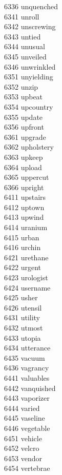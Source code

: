 6336 unquenched \\
6341 unroll \\
6342 unscrewing \\
6343 untied \\
6344 unusual \\
6345 unveiled \\
6346 unwrinkled \\
6351 unyielding \\
6352 unzip \\
6353 upbeat \\
6354 upcountry \\
6355 update \\
6356 upfront \\
6361 upgrade \\
6362 upholstery \\
6363 upkeep \\
6364 upload \\
6365 uppercut \\
6366 upright \\
6411 upstairs \\
6412 uptown \\
6413 upwind \\
6414 uranium \\
6415 urban \\
6416 urchin \\
6421 urethane \\
6422 urgent \\
6423 urologist \\
6424 username \\
6425 usher \\
6426 utensil \\
6431 utility \\
6432 utmost \\
6433 utopia \\
6434 utterance \\
6435 vacuum \\
6436 vagrancy \\
6441 valuables \\
6442 vanquished \\
6443 vaporizer \\
6444 varied \\
6445 vaseline \\
6446 vegetable \\
6451 vehicle \\
6452 velcro \\
6453 vendor \\
6454 vertebrae \\
